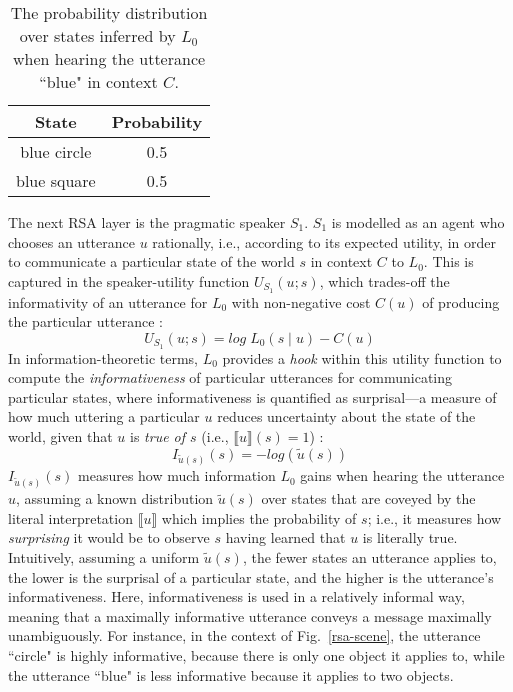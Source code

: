 \begin{table}[h]
	\begin{center}
		\caption{The probability distribution over states inferred by $L_0$ when hearing the utterance ``blue" in context $C$.}
		\label{rsa-l0}
		\vskip 0.12in
		\begin{tabular}{cc}
			State & Probability \\
			\hline
			blue circle & 0.5 \\
			blue square & 0.5 \\
			\hline
		\end{tabular}
	\end{center}
\end{table}

The next RSA layer is the pragmatic speaker $S_1$. $S_1$ is modelled as an agent who chooses an utterance $u$ rationally, i.e., according to its expected utility, in order to communicate a particular state of the world $s$ in context $C$ to $L_0$. This is captured in the speaker-utility function $U_{S_1}(u; s)$, which trades-off the informativity of an utterance for $L_0$ with non-negative cost $C(u)$ of producing the particular utterance \parencite{problang}:
\begin{equation}
U_{S_1} (u;s) = log \; L_0(s \mid u) - C(u)
\end{equation}
In information-theoretic terms, $L_0$ provides a \emph{hook} within this utility function to compute the \emph{informativeness} of particular utterances for communicating particular states, where informativeness is quantified as surprisal---a measure of how much uttering a particular $u$ reduces uncertainty about the state of the world, given that $u$ is \emph{true of $s$} (i.e., $\llbracket u \rrbracket (s) = 1$) \parencite{frank2012predicting}: 
\begin{equation}
I_{ \tilde{u} (s)}(s) = -log(\tilde{u} (s))
\end{equation}
$I_{\tilde{u} (s)}(s)$ measures how much information $L_0$ gains when hearing the utterance $u$, assuming a known distribution $\tilde{u} (s)$ over states that are coveyed by the literal interpretation $\llbracket u \rrbracket$ which implies the probability of $s$; i.e., it measures how \emph{surprising} it would be to observe $s$ having learned that $u$ is literally true.
Intuitively, assuming a uniform $\tilde{u} (s)$, the fewer states an utterance applies to, the lower is the surprisal of a particular state, and the higher is the utterance's informativeness. Here, informativeness is used in a relatively informal way, meaning that a maximally informative utterance conveys a message maximally unambiguously. For instance, in the context of Fig.~\ref{rsa-scene}, the utterance ``circle" is highly informative, because there is only one object it applies to, while the utterance ``blue" is less informative because it applies to two objects. 
